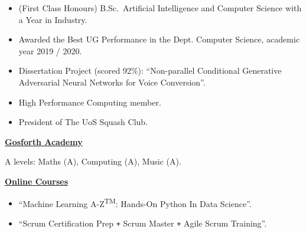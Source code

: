 \documentclass[10pt]{article} %
\begin{document}
\begin{changemargin}{0pt}{0.5pt}
\begin{minipage}[t]{0.44\textwidth}
\begin{changemargin}{1pt}{1pt}
\begin{itemize} \itemsep-2pt %
  \item (First Class Honours) B.Sc.\ Artificial Intelligence and Computer Science with a Year in Industry.
  \item Awarded the Best UG Performance in the Dept. Computer Science, academic year 2019 / 2020.
  \item Dissertation Project (scored 92\%): \enquote{Non-parallel Conditional Generative Adversarial Neural Networks for Voice Conversion}.
  \item High Performance Computing member.
  \item President of The UoS Squash Club.
\end{itemize}

	
\vspace{5pt}
\underline{\textbf{Gosforth Academy}}\\
\par
\vspace{-15pt}

\vspace{5pt}
A levels: Maths (A), Computing (A), Music (A).


\vspace{5pt}
\underline{\textbf{Online Courses}}\\
\par
\vspace{-15pt}

\begin{itemize} \itemsep-2pt %
	\item \enquote{Machine Learning A-Z\textsuperscript{TM}: Hands-On Python In Data Science}.
	\item \enquote{Scrum Certification Prep \texttt{+} Scrum Master \texttt{+} Agile Scrum Training}.
\end{itemize}
	

\end{changemargin}
\end{minipage}
\end{changemargin}
\end{document}
